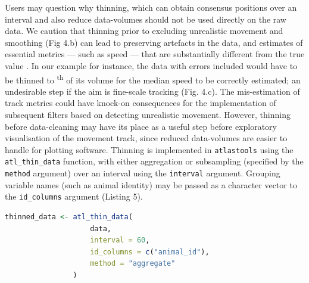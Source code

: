 \documentclass[10pt,paper=a4,headings=standardclasses
]{scrartcl}
\begin{document}
Users may question why thinning, which can obtain consensus positions over an interval and also reduce data-volumes should not be used directly on the raw data.
We caution that thinning prior to excluding unrealistic movement and smoothing (Fig 4.b) can lead to preserving artefacts in the data, and estimates of essential metrics --- such as speed --- that are substantially different from the true value \citep[see Fig. 4.c;][]{noonan2019}.
In our example for instance, the data with errors included would have to be thinned to \textsuperscript{th} of its volume for the median speed to be correctly estimated; an undesirable step if the aim is fine-scale tracking (Fig. 4.c).
The mis-estimation of track metrics could have knock-on consequences for the implementation of subsequent filters based on detecting unrealistic movement.
However, thinning before data-cleaning may have its place as a useful step before exploratory visualisation of the movement track, since reduced data-volumes are easier to handle for plotting software.
%
Thinning is implemented in \texttt{atlastools} using the \texttt{atl\_thin\_data} function, with either aggregation or subsampling (specified by the \texttt{method} argument) over an interval using the \texttt{interval} argument.
Grouping variable names (such as animal identity) may be passed as a character vector to the \texttt{id\_columns} argument (Listing 5).

\begin{lstlisting}[float, language=R, style=customR, caption = {Code to thin data by aggregation in \texttt{atlastools}. The method can be either "aggregate" or "subsample". 
The time interval is specified in seconds, while the \texttt{id\_columns} allows a character vector of column names to be passed to the function, with these columns used as identity variables.
Both methods return a dataset with one rows per time-interval.}]
thinned_data <- atl_thin_data(
                    data,
                    interval = 60,
                    id_columns = c("animal_id"),
                    method = "aggregate"
                )
\end{lstlisting}
\end{document}
